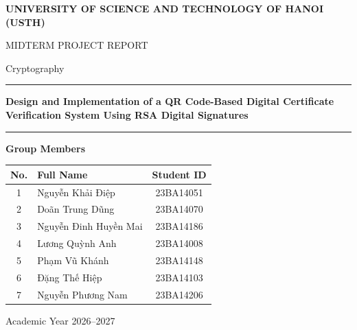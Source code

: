 \documentclass[10pt,a4paper]{article}
\renewcommand{\arraystretch}{1.1}
\begin{document}

\begin{titlepage}
    \centering

    \vspace*{1.5cm}

    {\Large\bfseries
    UNIVERSITY OF SCIENCE AND TECHNOLOGY OF HANOI (USTH)
    \par}

    \vspace{0.4cm}

    {\large
    MIDTERM PROJECT REPORT
    \par}

    {\normalsize
    Cryptography
    \par}

    \vspace{2cm}

    \rule{\textwidth}{0.6pt}

    \vspace{0.6cm}

    {\LARGE\bfseries
    Design and Implementation of a QR Code-Based
    Digital Certificate Verification System Using RSA
    Digital Signatures
    \par}

    \vspace{0.6cm}

    \rule{\textwidth}{0.6pt}

    \vspace{1.5cm}

    {\large\bfseries
    Group Members
    \par}

    \vspace{0.5cm}

    \renewcommand{\arraystretch}{1.5}
    \begin{tabular}{|c|l|c|}
        \hline
        \textbf{No.} & \textbf{Full Name} & \textbf{Student ID} \\
        \hline
        1 & Nguyễn Khải Điệp & 23BA14051 \\
        \hline
        2 & Doãn Trung Dũng & 23BA14070 \\
        \hline
        3 & Nguyễn Đinh Huyền Mai & 23BA14186 \\
        \hline
        4 & Lương Quỳnh Anh & 23BA14008 \\
        \hline
        5 & Phạm Vũ Khánh & 23BA14148 \\
        \hline
        6 & Đặng Thế Hiệp & 23BA14103 \\
        \hline
        7 & Nguyễn Phương Nam & 23BA14206 \\
        \hline
    \end{tabular}

    \vfill

    {\normalsize
    Academic Year 2026--2027
    \par}

    \vspace{0.5cm}

\end{titlepage}
\end{document}
